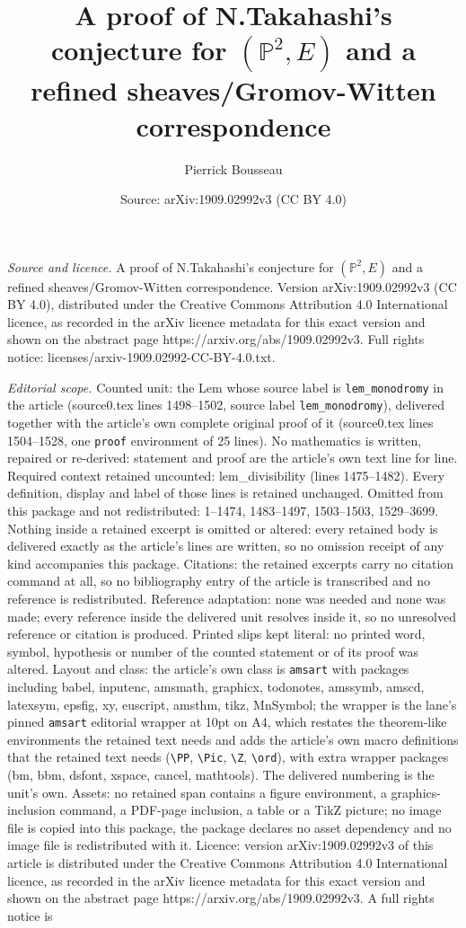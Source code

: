 \documentclass[10pt,a4paper]{amsart}
\title[A proof of N.Takahashi's conjecture for $(\mathbb{P}^2,E)$ a]{A proof of N.Takahashi's conjecture for $(\mathbb{P}^2,E)$ and a refined sheaves/Gromov-Witten correspondence}
\author{Pierrick Bousseau}
\date{Source: arXiv:1909.02992v3 (CC BY 4.0)}
\begin{document}
\maketitle

\noindent\emph{Source and licence.} A proof of N.Takahashi's conjecture for $(\mathbb{P}^2,E)$ and a refined sheaves/Gromov-Witten correspondence. Version arXiv:1909.02992v3 (CC BY 4.0), distributed under the Creative Commons Attribution 4.0 International licence, as recorded in the arXiv licence metadata for this exact version and shown on the abstract page https://arxiv.org/abs/1909.02992v3. Full rights notice: licenses/arxiv-1909.02992-CC-BY-4.0.txt.\par\smallskip

\noindent\textit{Editorial scope.} Counted unit: the Lem whose source label is \texttt{lem\_monodromy} in the article (source0.tex lines 1498--1502, source label \texttt{lem\_monodromy}), delivered together with the article's own complete original proof of it (source0.tex lines 1504--1528, one \texttt{proof} environment of 25 lines). No mathematics is written, repaired or re-derived: statement and proof are the article's own text line for line. Required context retained uncounted: lem\_divisibility (lines 1475--1482). Every definition, display and label of those lines is retained unchanged. Omitted from this package and not redistributed: 1--1474, 1483--1497, 1503--1503, 1529--3699. Nothing inside a retained excerpt is omitted or altered: every retained body is delivered exactly as the article's lines are written, so no omission receipt of any kind accompanies this package. Citations: the retained excerpts carry no citation command at all, so no bibliography entry of the article is transcribed and no reference is redistributed. Reference adaptation: none was needed and none was made; every reference inside the delivered unit resolves inside it, so no unresolved reference or citation is produced. Printed slips kept literal: no printed word, symbol, hypothesis or number of the counted statement or of its proof was altered. Layout and class: the article's own class is \texttt{amsart} with packages including babel, inputenc, amsmath, graphicx, todonotes, amssymb, amscd, latexsym, epsfig, xy, euscript, amsthm, tikz, MnSymbol; the wrapper is the lane's pinned \texttt{amsart} editorial wrapper at 10pt on A4, which restates the theorem-like environments the retained text needs and adds the article's own macro definitions that the retained text needs (\texttt{\textbackslash PP}, \texttt{\textbackslash Pic}, \texttt{\textbackslash Z}, \texttt{\textbackslash ord}), with extra wrapper packages (bm, bbm, dsfont, xspace, cancel, mathtools). The delivered numbering is the unit's own. Assets: no retained span contains a figure environment, a graphics-inclusion command, a PDF-page inclusion, a table or a TikZ picture; no image file is copied into this package, the package declares no asset dependency and no image file is redistributed with it. Licence: version arXiv:1909.02992v3 of this article is distributed under the Creative Commons Attribution 4.0 International licence, as recorded in the arXiv licence metadata for this exact version and shown on the abstract page https://arxiv.org/abs/1909.02992v3. A full rights notice is 
\end{document}
